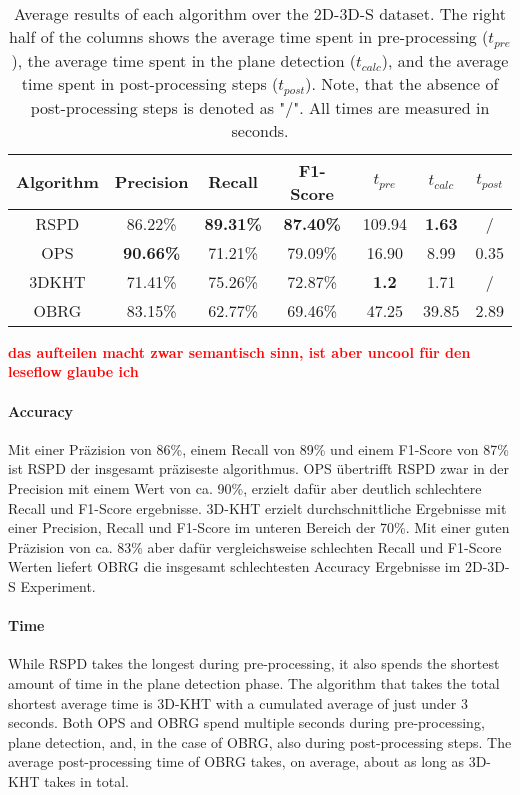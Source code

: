 \documentclass[main.tex]{subfiles}
\begin{document}
\begin{table}[H]
    \centering
    \begin{tabular}{c|cccccc}
        Algorithm & Precision        & Recall           & F1-Score         & $t_{pre}$    & $t_{calc}$    & $t_{post}$ \\ \hline
        RSPD      & 86.22\%          & \textbf{89.31\%} & \textbf{87.40\%} & 109.94       & \textbf{1.63} & /          \\
        OPS       & \textbf{90.66\%} & 71.21\%          & 79.09\%          & 16.90        & 8.99          & 0.35       \\
        3DKHT     & 71.41\%          & 75.26\%          & 72.87\%          & \textbf{1.2} & 1.71          & /          \\
        OBRG      & 83.15\%          & 62.77\%          & 69.46\%          & 47.25        & 39.85         & 2.89
    \end{tabular}
    \caption[Overall 2D-3D-S Results]{Average results of each algorithm over the 2D-3D-S dataset. The right half of the columns shows the average time spent in
        pre-processing ($t_{pre}$), the average time spent in the plane detection ($t_{calc}$), and the average time spent in post-processing steps ($t_{post}$).
        Note, that the absence of post-processing steps is denoted as "/". All times are measured in seconds.}
    \label{tab:res-3d2ds-total}
\end{table}

\textbf{\textcolor{red}{das aufteilen macht zwar semantisch sinn, ist aber uncool für den leseflow glaube ich }}

\paragraph{Accuracy}
Mit einer Präzision von 86\%, einem Recall von 89\% und einem F1-Score von 87\% ist RSPD der insgesamt präziseste algorithmus. OPS übertrifft RSPD zwar
in der Precision mit einem Wert von ca. 90\%, erzielt dafür aber deutlich schlechtere Recall und F1-Score ergebnisse.
3D-KHT erzielt durchschnittliche Ergebnisse mit einer Precision, Recall und F1-Score im unteren Bereich der 70\%.
Mit einer guten Präzision von ca. 83\% aber dafür vergleichsweise schlechten Recall und F1-Score Werten liefert OBRG die insgesamt schlechtesten
Accuracy Ergebnisse im 2D-3D-S Experiment.

\paragraph{Time}
While RSPD takes the longest during pre-processing, it also spends the shortest amount of time in the plane detection phase.
The algorithm that takes the total shortest average time is 3D-KHT with a cumulated average of just under 3 seconds.
Both OPS and OBRG spend multiple seconds during pre-processing, plane detection, and, in the case of OBRG, also during post-processing steps.
The average post-processing time of OBRG takes, on average, about as long as 3D-KHT takes in total.
\end{document}
